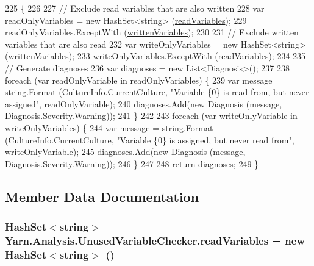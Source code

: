\begin{DoxyCode}
225         \{
226 
227             \textcolor{comment}{// Exclude read variables that are also written}
228             var readOnlyVariables = \textcolor{keyword}{new} HashSet<string> (\hyperlink{a00187_a6b542092ddce1b92c9455d60899518a9}{readVariables});
229             readOnlyVariables.ExceptWith (\hyperlink{a00187_a0c2fe6eded1b10b135ca2469f5980a39}{writtenVariables});
230 
231             \textcolor{comment}{// Exclude written variables that are also read}
232             var writeOnlyVariables = \textcolor{keyword}{new} HashSet<string> (\hyperlink{a00187_a0c2fe6eded1b10b135ca2469f5980a39}{writtenVariables});
233             writeOnlyVariables.ExceptWith (\hyperlink{a00187_a6b542092ddce1b92c9455d60899518a9}{readVariables});
234 
235             \textcolor{comment}{// Generate diagnoses}
236             var diagnoses = \textcolor{keyword}{new} List<Diagnosis>();
237 
238             \textcolor{keywordflow}{foreach} (var readOnlyVariable \textcolor{keywordflow}{in} readOnlyVariables) \{
239                 var message = string.Format (CultureInfo.CurrentCulture, \textcolor{stringliteral}{"Variable \{0\} is read from, but
       never assigned"}, readOnlyVariable);
240                 diagnoses.Add(\textcolor{keyword}{new} Diagnosis (message, Diagnosis.Severity.Warning));
241             \}
242 
243             \textcolor{keywordflow}{foreach} (var writeOnlyVariable \textcolor{keywordflow}{in} writeOnlyVariables) \{
244                 var message = string.Format (CultureInfo.CurrentCulture, \textcolor{stringliteral}{"Variable \{0\} is assigned, but
       never read from"}, writeOnlyVariable);
245                 diagnoses.Add(\textcolor{keyword}{new} Diagnosis (message, Diagnosis.Severity.Warning));
246             \}
247 
248             \textcolor{keywordflow}{return} diagnoses;
249         \}
\end{DoxyCode}


\subsection{Member Data Documentation}
\hypertarget{a00187_a6b542092ddce1b92c9455d60899518a9}{
\subsubsection[{read\-Variables}]{\setlength{\rightskip}{0pt plus 5cm}Hash\-Set$<$string$>$ Yarn.\-Analysis.\-Unused\-Variable\-Checker.\-read\-Variables = new Hash\-Set$<$string$>$ ()\hspace{0.3cm}{\ttfamily [private]}}}\label{a00187_a6b542092ddce1b92c9455d60899518a9}


